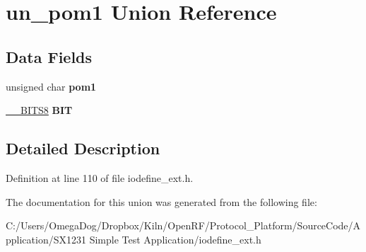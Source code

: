 \hypertarget{unionun__pom1}{\section{un\-\_\-pom1 Union Reference}
\label{unionun__pom1}
}
\subsection*{Data Fields}
\begin{DoxyCompactItemize}
\item 
\hypertarget{unionun__pom1_aab0309772da67cd8ef8a1dd1405f817d}{unsigned char {\bfseries pom1}}\label{unionun__pom1_aab0309772da67cd8ef8a1dd1405f817d}

\item 
\hypertarget{unionun__pom1_ab02a43342cfec88fed8b07f9d89e8da9}{\hyperlink{struct_____b_i_t_s8}{\-\_\-\-\_\-\-B\-I\-T\-S8} {\bfseries B\-I\-T}}\label{unionun__pom1_ab02a43342cfec88fed8b07f9d89e8da9}

\end{DoxyCompactItemize}


\subsection{Detailed Description}


Definition at line 110 of file iodefine\-\_\-ext.\-h.



The documentation for this union was generated from the following file\-:\begin{DoxyCompactItemize}
\item 
C\-:/\-Users/\-Omega\-Dog/\-Dropbox/\-Kiln/\-Open\-R\-F/\-Protocol\-\_\-\-Platform/\-Source\-Code/\-Application/\-S\-X1231 Simple Test Application/iodefine\-\_\-ext.\-h\end{DoxyCompactItemize}
